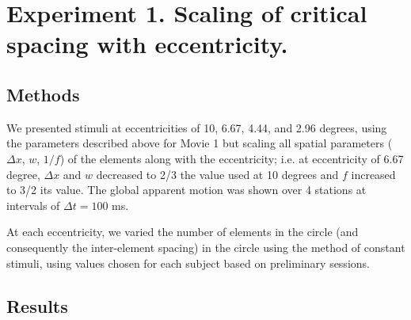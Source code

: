 \documentclass[../manuscript.tex]{subfiles}
\begin{document}
\section[Experiment 1]{Experiment 1. Scaling of critical spacing with eccentricity.}\label{sec:constant}

\subsection{Methods}

We presented stimuli at eccentricities of 10, 6.67, 4.44, and 2.96
degrees, using the parameters described above for Movie 1
but scaling all spatial parameters (${\Delta}x$, $w$, $1/f$) of the
elements along with the eccentricity; i.e. at eccentricity of 6.67
degree, ${\Delta}x$ and $w$ decreased to 2/3 the value used at 10
degrees and $f$ increased to 3/2 its value. The global apparent motion
was shown over 4 stations at intervals of ${\Delta}t=100$ ms.

At each eccentricity, we varied the number of elements in the circle (and consequently the inter-element spacing) in the circle using the method of constant stimuli, using
values chosen for each subject based on preliminary sessions.

\subsection{Results}
\end{document}
